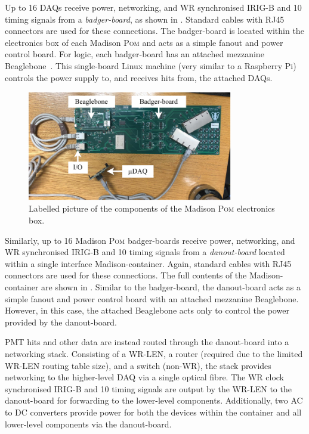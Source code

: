 Up to 16 \si{\micro}DAQs receive power, networking, and WR synchronised IRIG-B and
\SI{10}{} timing signals from a \emph{badger-board}, as shown in
. Standard cables with RJ45 connectors are used for these
connections. The badger-board is located within the electronics box of each Madison \textsc{Pom}
and acts as a simple fanout and power control board. For logic, each badger-board has an attached
mezzanine Beaglebone~\cite{beagle2020}. This single-board Linux machine (very similar to a
Raspberry Pi) controls the power supply to, and receives hits from, the attached \si{\micro}DAQs.

\begin{figure} %
    \includegraphics[width=0.8\textwidth]{diagrams/5-daq/madison_plane.pdf}
    \caption[Labelled picture of the components of the Madison \textsc{Pom} electronics box]
    {Labelled picture of the components of the Madison \textsc{Pom} electronics box.}
    \label{fig:madison_plane}
\end{figure}

Similarly, up to 16 Madison \textsc{Pom} badger-boards receive power, networking, and WR
synchronised IRIG-B and \SI{10}{} timing signals from a \emph{danout-board} located
within a single interface Madison-container. Again, standard cables with RJ45 connectors are used
for these connections. The full contents of the Madison-container are shown in
. Similar to the badger-board, the danout-board acts as a simple fanout
and power control board with an attached mezzanine Beaglebone. However, in this case, the attached
Beaglebone acts only to control the power provided by the danout-board.

PMT hits and other data are instead routed through the danout-board into a networking stack.
Consisting of a WR-LEN, a router (required due to the limited WR-LEN routing table size), and a
switch (non-WR), the stack provides networking to the higher-level DAQ via a single optical fibre.
The WR clock synchronised IRIG-B and \SI{10}{} timing signals are output by the WR-LEN
to the danout-board for forwarding to the lower-level components. Additionally, two AC to DC
converters provide power for both the devices within the container and all lower-level components
via the danout-board.

